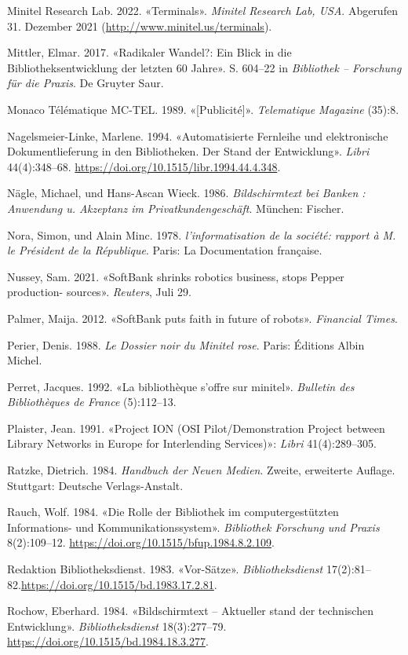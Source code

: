 \documentclass[a4paper,
fontsize=11pt,
oneside,
numbers=noperiodatend,
parskip=half-,
bibliography=totoc,
final
]{scrartcl}
\begin{document}
Minitel Research Lab. 2022. «Terminals». \emph{Minitel Research Lab,
USA}. Abgerufen 31. Dezember 2021
(\url{http://www.minitel.us/terminals}).

Mittler, Elmar. 2017. «Radikaler Wandel?: Ein Blick in die
Bibliotheksentwicklung der letzten 60 Jahre». S. 604--22 in
\emph{Bibliothek -- Forschung für die Praxis}. De Gruyter Saur.

Monaco Télématique MC-TEL. 1989. «{[}Publicité{]}». \emph{Telematique
Magazine} (35):8.

Nagelsmeier-Linke, Marlene. 1994. «Automatisierte Fernleihe und
elektronische Dokumentlieferung in den Bibliotheken. Der Stand der
Entwicklung». \emph{Libri} 44(4):348--68.
\url{https://doi.org/10.1515/libr.1994.44.4.348}.

Nägle, Michael, und Hans-Ascan Wieck. 1986. \emph{Bildschirmtext bei
Banken : Anwendung u. Akzeptanz im Privatkundengeschäft}. München:
Fischer.

Nora, Simon, und Alain Minc. 1978. \emph{l'informatisation de la
société: rapport à M. le Président de la République}. Paris: La
Documentation française.

Nussey, Sam. 2021. «SoftBank shrinks robotics business, stops Pepper
production- sources». \emph{Reuters}, Juli 29.

Palmer, Maija. 2012. «SoftBank puts faith in future of robots».
\emph{Financial Times}.

Perier, Denis. 1988. \emph{Le Dossier noir du Minitel rose}. Paris:
Éditions Albin Michel.

Perret, Jacques. 1992. «La bibliothèque s'offre sur minitel».
\emph{Bulletin des Bibliothèques de France} (5):112--13.

Plaister, Jean. 1991. «Project ION (OSI Pilot/Demonstration Project
between Library Networks in Europe for Interlending Services)»:
\emph{Libri} 41(4):289--305.

Ratzke, Dietrich. 1984. \emph{Handbuch der Neuen Medien}. Zweite,
erweiterte Auflage. Stuttgart: Deutsche Verlags-Anstalt.

Rauch, Wolf. 1984. «Die Rolle der Bibliothek im computergestützten
Informations- und Kommunikationssystem». \emph{Bibliothek Forschung und
Praxis} 8(2):109--12. \url{https://doi.org/10.1515/bfup.1984.8.2.109}.

Redaktion Bibliotheksdienst. 1983. «Vor-Sätze». \emph{Bibliotheksdienst}
17(2):81--82.\url{https://doi.org/10.1515/bd.1983.17.2.81}.

Rochow, Eberhard. 1984. «Bildschirmtext -- Aktueller stand der
technischen Entwicklung». \emph{Bibliotheksdienst} 18(3):277--79.
\url{https://doi.org/10.1515/bd.1984.18.3.277}.
\end{document}
